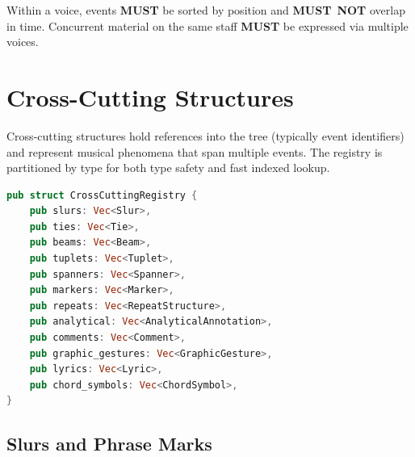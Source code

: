 \documentclass[11pt,letterpaper]{report}
\newcounter{requirement}[chapter]
\newcommand{\MUST}{\textbf{MUST}}
\newcommand{\MUSTNOT}{\textbf{MUST}\nobreak\ \textbf{NOT}}
\begin{document}
\begin{requirement}
  \label{req:graph:voice-event-nonoverlap}
  Within a voice, events \MUST{} be sorted by position and \MUSTNOT{}
  overlap in time. Concurrent material on the same staff \MUST{} be
  expressed via multiple voices.
\end{requirement}

\section{Cross-Cutting Structures}
\label{sec:graph:cross}

Cross-cutting structures hold references into the tree (typically
event identifiers) and represent musical phenomena that span multiple
events. The registry is partitioned by type for both type safety
and fast indexed lookup.

\begin{lstlisting}[language=Rust]
pub struct CrossCuttingRegistry {
    pub slurs: Vec<Slur>,
    pub ties: Vec<Tie>,
    pub beams: Vec<Beam>,
    pub tuplets: Vec<Tuplet>,
    pub spanners: Vec<Spanner>,
    pub markers: Vec<Marker>,
    pub repeats: Vec<RepeatStructure>,
    pub analytical: Vec<AnalyticalAnnotation>,
    pub comments: Vec<Comment>,
    pub graphic_gestures: Vec<GraphicGesture>,
    pub lyrics: Vec<Lyric>,
    pub chord_symbols: Vec<ChordSymbol>,
}
\end{lstlisting}

\subsection{Slurs and Phrase Marks}
\label{sec:graph:slurs}
\end{document}
